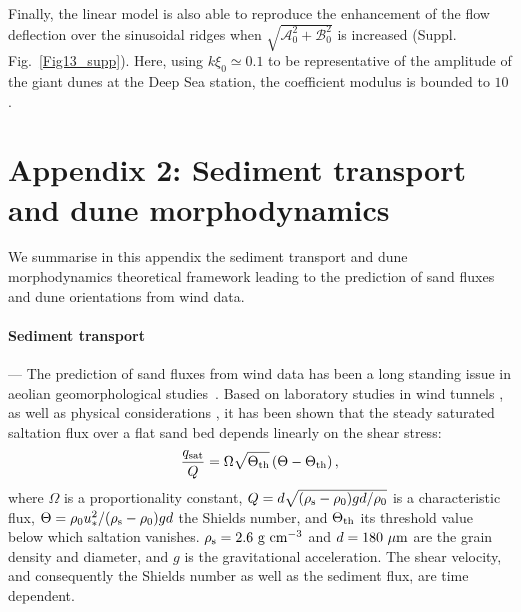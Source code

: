 Finally, the linear model is also able to reproduce the enhancement of the flow deflection over the sinusoidal ridges when $\sqrt{\mathcal{A}_{0}^{2} + \mathcal{B}_{0}^{2}}$ is increased (Suppl. Fig.~\ref{Fig13_supp}). Here, using $k\xi_0 \simeq 0.1$ to be representative of the amplitude of the giant dunes at the Deep Sea station, the coefficient modulus is bounded to $10$.


\section*{Appendix 2: Sediment transport and dune morphodynamics}

We summarise in this appendix the sediment transport and dune morphodynamics theoretical framework leading to the prediction of sand fluxes and dune orientations from wind data.

\paragraph{Sediment transport} ---
The prediction of sand fluxes from wind data has been a long standing issue in aeolian geomorphological studies~\citep{Fryberger79, Pearce2005, Sherman2012, Shen2019}. Based on laboratory studies in wind tunnels \citep{Rasmussen96, Iversen99, Creyssels2009, Ho2011}, as well as physical considerations \citep{Ungar1987, Andreotti2004bis, Duran2011, Pahtz2020}, it has been shown that the steady saturated saltation flux over a flat sand bed depends linearly on the shear stress:
%
\begin{equation}
\label{transport_law_quadratic}
\frac{q_{\textup{sat}}}{Q} = \Omega\sqrt{\Theta_{\textup{th}}}\left(\Theta - \Theta_{\textup{th}}\right),
\end{equation}
%
where $\Omega$ is a proportionality constant, $Q = d\sqrt{(\rho_{\textup{s}} - \rho_{0})gd/\rho_{0}}$ is a characteristic flux, $\Theta = \rho_{0} u_{*}^{2}/(\rho_{\textup{s}} - \rho_{0})gd$ the Shields number, and $\Theta_{\textup{th}}$ its threshold value below which saltation vanishes. $\rho_{\textup{s}} = 2.6~\textup{g}~\textup{cm}^{-3}$ and $d=180~\mu\textup{m}$ are the grain density and diameter, and $g$ is the gravitational acceleration. The shear velocity, and consequently the Shields number as well as the sediment flux, are time dependent.

